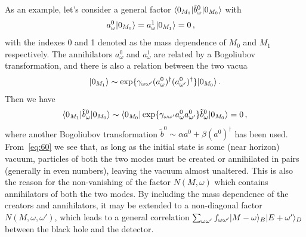 \documentclass[12pt,a4paper]{article}
\begin{document}
As an example, let's consider a general factor $\langle0_{M_1}\arrowvert\tilde{b}^0_{\omega}\arrowvert0_{M_0}\rangle$ with
\begin{equation}
\label{eq:58}
\begin{split}
a^0_{\omega}\arrowvert0_{M_0}\rangle &=
a^1_{\omega}\arrowvert0_{M_1}\rangle = 0 \,,
\end{split}
\end{equation}
with the indexes 0 and 1 denoted as the mass
dependence of $M_0$ and $M_1$ respectively. The annihilators
$a^0_{\omega}$ and $a^1_{\omega}$ are related by a Bogoliubov
transformation, and there is also a relation between the two vacua
\begin{equation}
\label{eq:59}
\begin{split}
\arrowvert0_{M_1}\rangle\sim
\exp\{\gamma_{\omega\omega'}(a^0_{\omega})^{\dag}(a^0_{\omega'})^{\dag}\}\arrowvert0_{M_0}\rangle
\,.
\end{split}
\end{equation}
Then we have
\begin{equation}
\label{eq:60}
\begin{split}
\langle0_{M_1}\arrowvert\tilde{b}^0_{\omega}\arrowvert0_{M_0}\rangle\sim
\langle0_{M_0}\arrowvert\exp\{\gamma_{\omega\omega'}a^0_{\omega}a^0_{\omega'}\}\tilde{b}^0_{\omega}\arrowvert0_{M_0}\rangle
= 0 \,,
\end{split}
\end{equation}
where another Bogoliubov transformation $\tilde{b}^0\sim \alpha
a^0+\beta (a^0)^{\dag}$ has been used. From~\eqref{eq:60} we see that, as long as the initial
state is some (near horizon) vacuum, particles of both the two modes must be created or annihilated in pairs
(generally in even numbers), leaving the vacuum almost unaltered. This is also the reason for the non-vanishing of the factor
$N(M,\omega)$ which contains annihilators of both the two modes. By including the mass dependence of the creators and annihilators, it
may be extended to a non-diagonal factor $N(M,\omega,\omega')$, which leads to a general
correlation $\sum_{\omega \omega'}f_{\omega \omega'}\arrowvert
M-\omega\rangle_B\arrowvert E+\omega'\rangle_D$ between the black hole and the detector.
\end{document}
